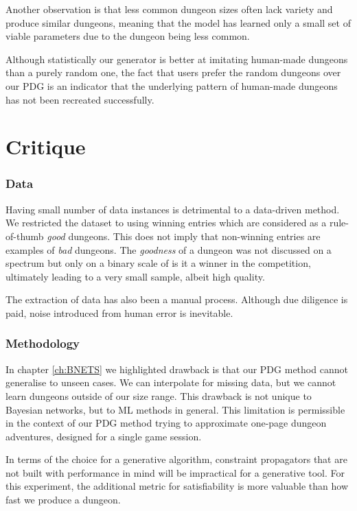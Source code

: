 \documentclass{UoYCSproject}
\begin{document}
Another observation is that less common dungeon sizes often lack variety and produce similar dungeons, meaning that the model has learned only a small set of viable parameters due to the dungeon being less common.

Although statistically our generator is better at imitating human-made dungeons than a purely random one, the fact that users prefer the random dungeons over our PDG is an indicator that the underlying pattern of human-made dungeons has not been recreated successfully.

\section{Critique}

\subsubsection{Data}
Having small number of data instances is detrimental to a data-driven method. We restricted the dataset to using winning entries which are considered as a rule-of-thumb \textit{good} dungeons. This does not imply that non-winning entries are examples of \textit{bad} dungeons. The \textit{goodness} of a dungeon was not discussed on a spectrum but only on a binary scale of is it a winner in the competition, ultimately leading to a very small sample, albeit high quality.

The extraction of data has also been a manual process. Although due diligence is paid, noise introduced from human error is inevitable.

\subsubsection{Methodology}
In chapter \ref{ch:BNETS} we highlighted drawback is that our PDG method cannot generalise to unseen cases. We can interpolate for missing data, but we cannot learn dungeons outside of our size range. This drawback is not unique to Bayesian networks, but to ML methods in general. This limitation is permissible in the context of our PDG method trying to approximate one-page dungeon adventures, designed for a single game session.

In terms of the choice for a generative algorithm, constraint propagators that are not built with performance in mind will be impractical for a generative tool. For this experiment, the additional metric for satisfiability is more valuable than how fast we produce a dungeon.
\end{document}
